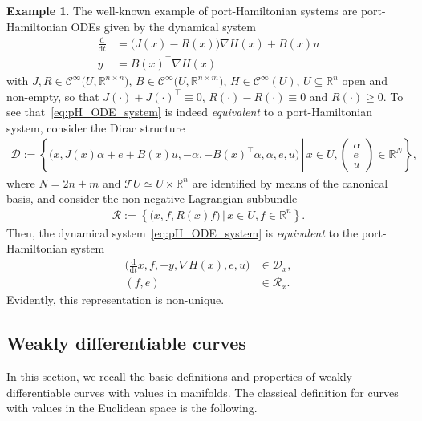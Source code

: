 \documentclass[preprint,12pt]{elsarticle}
\theoremstyle{definition}
\newtheorem{example}[theorem]{Example}
\newcommand{\set}[1]{\left\lbrace #1\right\rbrace}
\begin{document}
\begin{example}\label{ex:pH_ODE_system}
The well-known example of port-Hamiltonian systems are port-Hamiltonian ODEs given by the dynamical system
\begin{equation}\label{eq:pH_ODE_system}
\begin{aligned}
\tfrac{\mathrm{d}}{\mathrm{d}t} & = \big(J(x)-R(x)\big)\nabla H(x) + B(x)u\\
y & = B(x)^\top\nabla H(x)
\end{aligned}
\end{equation}
with $J,R\in\mathcal{C}^\infty\big(U,\mathbb{R}^{n\times n}\big)$, $B\in\mathcal{C}^\infty\big(U,\mathbb{R}^{n\times m}\big)$, $H\in\mathcal{C}^\infty(U)$, $U\subseteq\mathbb{R}^n$ open and non-empty, so that $J(\cdot)+J(\cdot)^\top\equiv 0$, $R(\cdot)-R(\cdot)\equiv 0$ and $R(\cdot)\geq 0$. To see that~\eqref{eq:pH_ODE_system} is indeed \textit{equivalent} to a port-Hamiltonian system, consider the Dirac structure
\begin{align*}
\mathcal{D} := \set{\big(x,J(x)\alpha+e+B(x)u,-\alpha,-B(x)^\top\alpha,\alpha,e,u\big)\,\left\vert\,x\in U, \begin{pmatrix}
\alpha\\e\\u
\end{pmatrix}\in\mathbb{R}^{N}\right.},
\end{align*}
where $N = 2n+m$ and $\mathcal{T}U\simeq U\times\mathbb{R}^n$ are identified by means of the canonical basis, and consider the non-negative Lagrangian subbundle
\begin{align*}
\mathcal{R} := \set{\big(x,f,R(x)f\big)\,\big\vert\,x\in U, f\in\mathbb{R}^n}.
\end{align*}
Then, the dynamical system~\eqref{eq:pH_ODE_system} is \textit{equivalent} to the port-Hamiltonian system
\begin{align*}
\big(\tfrac{\mathrm{d}}{\mathrm{d}t}x,f,-y,\nabla H(x),e,u\big) & \in\mathcal{D}_x,\\
(f,e) & \in\mathcal{R}_x.
\end{align*}
Evidently, this representation is non-unique.
\end{example}

\subsection{Weakly differentiable curves}\label{sec:Sobolev}

In this section, we recall the basic definitions and properties of weakly differentiable curves with values in manifolds. The classical definition for curves with values in the Euclidean space is the following.
\end{document}

